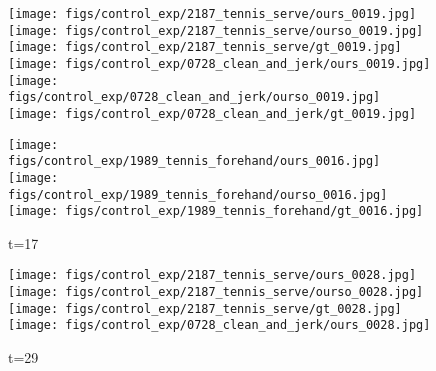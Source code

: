\documentclass{article}
\begin{document}
\begin{appendix}
\begin{figure*}[!thbp]
\begin{subfigure}{0.12\linewidth}
	\end{subfigure} 
    \begin{subfigure}{0.12\linewidth}
        \caption*{t=20}
        \vspace{-7pt}
	    \texttt{[image: figs/control\_exp/2187\_tennis\_serve/ours\_0019.jpg]}
	    \texttt{[image: figs/control\_exp/2187\_tennis\_serve/ourso\_0019.jpg]}
	    \vspace{.2cm}
  		\texttt{[image: figs/control\_exp/2187\_tennis\_serve/gt\_0019.jpg]}
  		\texttt{[image: figs/control\_exp/0728\_clean\_and\_jerk/ours\_0019.jpg]}
  		\texttt{[image: figs/control\_exp/0728\_clean\_and\_jerk/ourso\_0019.jpg]}
  		\vspace{.2cm}
  		\texttt{[image: figs/control\_exp/0728\_clean\_and\_jerk/gt\_0019.jpg]}
  		\caption*{t=17}
  		\vspace{-7pt}
  		\texttt{[image: figs/control\_exp/1989\_tennis\_forehand/ours\_0016.jpg]}
  		\texttt{[image: figs/control\_exp/1989\_tennis\_forehand/ourso\_0016.jpg]}
  		\vspace{.2cm}
  		\texttt{[image: figs/control\_exp/1989\_tennis\_forehand/gt\_0016.jpg]}
	\end{subfigure} 
    \begin{subfigure}{0.12\linewidth}
        \caption*{t=29}
        \vspace{-7pt}
	    \texttt{[image: figs/control\_exp/2187\_tennis\_serve/ours\_0028.jpg]}
	    \texttt{[image: figs/control\_exp/2187\_tennis\_serve/ourso\_0028.jpg]}
	    \vspace{.2cm}
  		\texttt{[image: figs/control\_exp/2187\_tennis\_serve/gt\_0028.jpg]}
  		\texttt{[image: figs/control\_exp/0728\_clean\_and\_jerk/ours\_0028.jpg]}

\end{subfigure}
\end{figure*}
\end{appendix}
\end{document}
